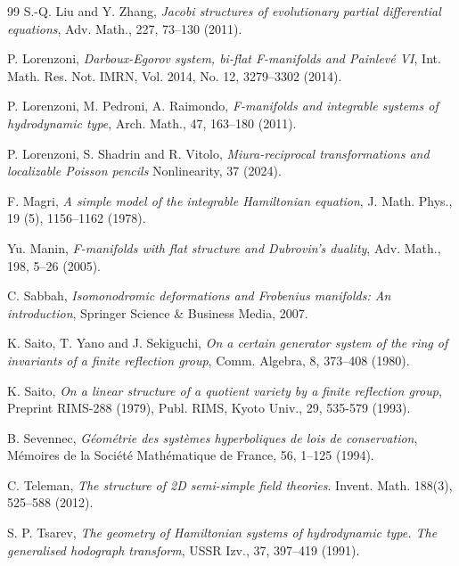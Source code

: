 \documentclass[11pt,a4paper]{amsart}
\numberwithin{equation}{section}
\numberwithin{equation}{section}
\begin{document}
\begin{thebibliography}{99}
S.-Q. Liu and Y. Zhang,  \emph{Jacobi structures of evolutionary partial differential equations}, Adv. Math., 227, 73–130 (2011).

P. Lorenzoni, \emph{Darboux-Egorov system, bi-flat F-manifolds and Painlev\'e VI}, Int. Math. Res. Not. IMRN, Vol. 2014, No. 12, 3279--3302 (2014).

P. Lorenzoni, M. Pedroni, A. Raimondo, \emph{F-manifolds and integrable systems
 of hydrodynamic type}, Arch. Math.,  
47, 163--180 (2011).

P. Lorenzoni,  S. Shadrin and  R. Vitolo, \emph{Miura-reciprocal transformations and localizable Poisson pencils}  Nonlinearity, 37 (2024).

 F. Magri, 
  \emph{A simple model of the integrable Hamiltonian equation}, J. Math. Phys., 19 (5), 1156–1162 (1978).
  
 Yu. Manin,
\emph{F-manifolds with flat structure and Dubrovin's duality},
Adv. Math., 198, 5--26 (2005).  
  
 C. Sabbah, \emph{Isomonodromic deformations and Frobenius manifolds: An introduction}, Springer Science \& Business Media, 2007.  

K. Saito, T. Yano and J. Sekiguchi, \emph{On a certain generator system of the ring of invariants of a finite reflection group}, Comm. Algebra, 8, 373–408 (1980).  

K. Saito, \emph{On a linear structure of a quotient variety by a finite reflection group}, Preprint RIMS-288 (1979), Publ. RIMS, Kyoto Univ., 29, 535-579 (1993).

B. Sevennec, \emph{G\'eom\'etrie des syst\`emes hyperboliques de lois de conservation}, M\'emoires de la Soci\'et\'e Math\'ematique de France, 56, 1--125 (1994).

C. Teleman, \emph{The structure of 2D semi-simple field theories}. Invent. Math. 188(3), 525–588 (2012).

S. P. Tsarev,
\emph{The geometry of Hamiltonian systems of hydrodynamic type. The generalised hodograph transform}, USSR Izv., 37, 397--419 (1991).

\end{thebibliography} 
\end{document}

